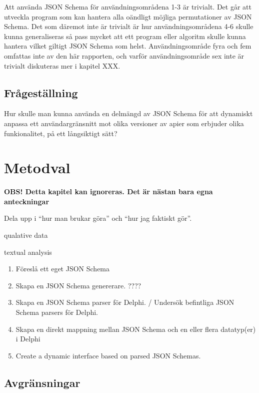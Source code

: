 \documentclass[swedish]{kththesis}
\begin{document}


\noindent
Att använda JSON Schema för användningsområdena 1-3 är trivialt. Det går att utveckla program som kan hantera alla oändligt möjliga permutationer av JSON Schema. Det som däremot inte är trivialt är hur användningsområdena 4-6 skulle kunna generaliseras så pass mycket att ett program eller algoritm skulle kunna hantera vilket giltigt JSON Schema som helst. Användningsområde fyra och fem omfattas inte av den här rapporten, och varför användningsområde sex inte är trivialt diskuteras mer i kapitel XXX.



\section{Frågeställning}

Hur skulle man kunna använda en delmängd av JSON Schema för att dynamiskt anpassa ett användargränsnitt mot olika versioner av apier som erbjuder olika funkionalitet, på ett långsiktigt sätt?


\chapter{Metodval}

\textbf{OBS! Detta kapitel kan ignoreras. Det är nästan bara egna anteckningar}

Dela upp i \enquote{hur man brukar göra} och \enquote{hur jag faktiskt gör}.

qualative data

textual analysis

\begin{enumerate}
	\item Föreslå ett eget JSON Schema
	\item Skapa en JSON Schema genererare. ????
	\item Skapa en JSON Schema parser för Delphi. / Undersök befintliga JSON Schema parsers för Delphi.
	\item Skapa en direkt mappning mellan JSON Schema och en eller flera datatyp(er) i Delphi
	\item Create a dynamic interface based on parsed JSON Schemas.
\end{enumerate}

\section{Avgränsningar}
\end{document}
